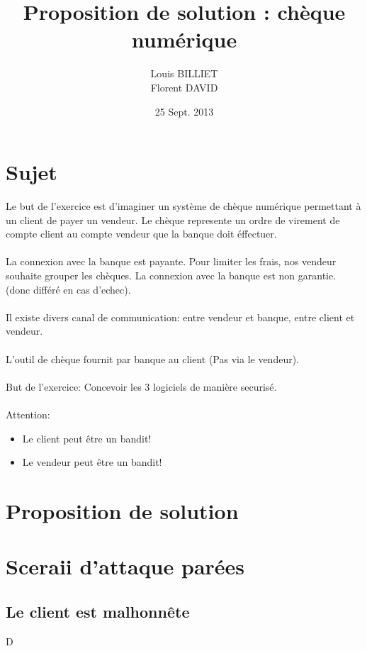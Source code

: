 \documentclass[oneside,12pt]{article}
\begin{document}
\title{Proposition de solution : ch\`eque num\'erique}
\author{Louis BILLIET \\ Florent DAVID}
\date{25 Sept. 2013}
\maketitle

\section{Sujet}
Le but de l'exercice est d'imaginer un syst\`eme de ch\`eque num\'erique permettant \`a un client de payer un vendeur.
Le ch\`eque represente un ordre de virement de compte client au compte vendeur que la banque doit \'effectuer.
\\
\\
La connexion avec la banque est payante. Pour limiter les frais, nos vendeur souhaite grouper les ch\`eques. 
La connexion avec la banque est non garantie. (donc diff\'er\'e en cas d'echec).
\\
\\
Il existe divers canal de communication: entre vendeur et banque, entre client et vendeur.
\\
\\
L'outil de ch\`eque fournit par banque au client (Pas via  le vendeur).
\\
\\
But de l'exercice: Concevoir les 3 logiciels de mani\`ere securis\'e.
\\
\\
Attention:
\begin{itemize}
  \item Le client peut \^etre un bandit!
  \item Le vendeur peut \^etre un bandit!
\end{itemize}

\section{}

\section{Proposition de solution}

\section{Sceraii d'attaque par\'ees}
\subsection{Le client est malhonn\^ete}
D
\end{document}
